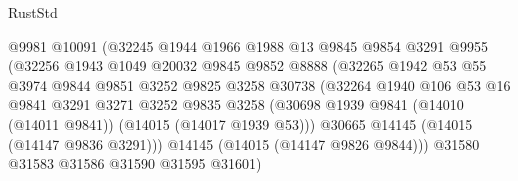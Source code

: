 \begin{lexlean}{RustStd}
\begin{coremodule}
                                  @9981
                                  @10091
                                  (@32245
                                    @1944
                                    @1966
                                    @1988
                                    @13
                                    @9845
                                    @9854
                                    @3291
                                    @9955
                                    (@32256
                                      @1943
                                      @1049
                                      @20032
                                      @9845
                                      @9852
                                      @8888
                                      (@32265
                                        @1942
                                        @53
                                        @55
                                        @3974
                                        @9844
                                        @9851
                                        @3252
                                        @9825
                                        @3258
                                        @30738
                                        (@32264
                                          @1940
                                          @106
                                          @53
                                          @16
                                          @9841
                                          @3291
                                          @3271
                                          @3252
                                          @9835
                                          @3258
                                          (@30698
                                            @1939
                                            @9841
                                            (@14010 (@14011 @9841))
                                            (@14015 (@14017 @1939 @53)))
                                          @30665
                                          @14145
                                          (@14015 (@14147 @9836 @3291)))
                                        @14145
                                        (@14015 (@14147 @9826 @9844)))
                                      @31580
                                      @31583
                                      @31586
                                      @31590
                                      @31595
                                      @31601)

\end{coremodule}
\end{lexlean}
